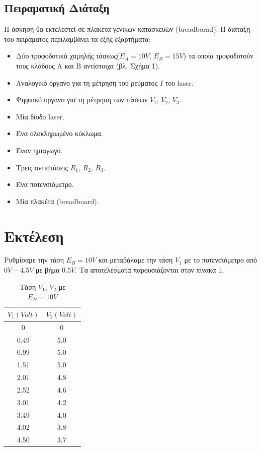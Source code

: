 \documentclass[a4paper,12pt,titlepage]{article}
\begin{document}
\subsection{Πειραματική Διάταξη}

Η άσκηση θα εκτελεστεί σε  πλακέτα γενικών κατασκευών (breadborad). H διάταξη του πειράματος περιλαμβάνει τα εξής εξαρτήματα:

\begin{itemize}
  \item Δύο τροφοδοτικά χαμηλής τάσεως($E_{A}=10V$, $E_{B}=15V$) τα οποία τροφοδοτούν τους κλάδους Α και Β αντίστοιχα (βλ. Σχήμα 1).
  \item Αναλογικό όργανο για τη μέτρηση του ρεύματος $Ι$ του laser.
  \item Ψηφιακό όργανο για τη μέτρηση των τάσεων $V_{1}$, $V_{2}$, $V_{3}$.
  \item Μία δίοδο laser.
  \item Ένα ολοκληρωμένο κύκλωμα.
  \item	Έναν ημιαγωγό.
  \item Τρεις αντιστάσεις $R_{1}$, $R_{2}$, $R_{3}$.
  \item	Ένα ποτενσιόμετρο.
  \item	Μία πλακέτα (breadboard).
\end{itemize}

\newpage

\section{Εκτέλεση}

Ρυθμίσαμε την τάση $E_{B}=10V$ και μεταβάλαμε την τάση $V_{1}$ με το ποτενσιόμετρο από $0V-4.5V$ με βήμα $0.5V$. Τα αποτελέσματα παρουσιάζονται στον πίνακα 1.

\begin{table}[h!]
\begin{center}
    \begin{tabular}{ | c | c |}
    \hline
     $V_{1} (Volt)$ & $V_{2} (Volt)$\\ \hline
     0	  &   0\\ \hline
     0.49 & 5.0\\ \hline
     0.99 & 5.0\\ \hline
     1.51 & 5.0\\ \hline
     2.01 & 4.8\\ \hline
     2.52 & 4.6\\ \hline
     3.01 & 4.2\\ \hline
     3.49 & 4.0\\ \hline
     4.02 & 3.8\\ \hline
     4.50 & 3.7\\ \hline
    \end{tabular}
\end{center}
\caption{Τάση $V_{1}$, $V_{2}$ με $E_{B}=10V$ }
\end{table}
\end{document}
